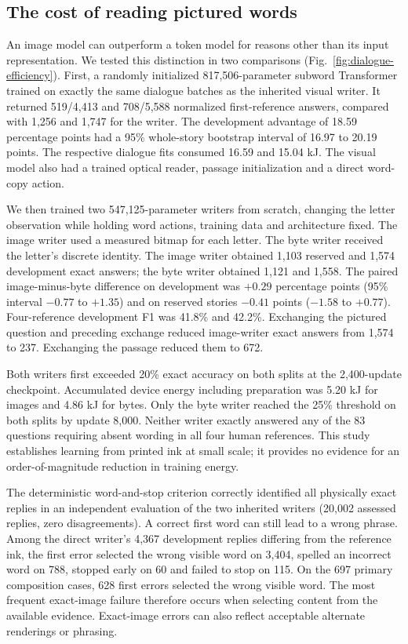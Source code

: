 \subsection*{The cost of reading pictured words}
An image model can outperform a token model for reasons other than its input representation. We tested this distinction in two comparisons (Fig.~\ref{fig:dialogue-efficiency}). First, a randomly initialized 817,506-parameter subword Transformer trained on exactly the same dialogue batches as the inherited visual writer. It returned 519/4,413 and 708/5,588 normalized first-reference answers, compared with 1,256 and 1,747 for the writer. The development advantage of 18.59 percentage points had a 95\% whole-story bootstrap interval of 16.97 to 20.19 points. The respective dialogue fits consumed 16.59 and 15.04 kJ. The visual model also had a trained optical reader, passage initialization and a direct word-copy action.

We then trained two 547,125-parameter writers from scratch, changing the letter observation while holding word actions, training data and architecture fixed. The image writer used a measured bitmap for each letter. The byte writer received the letter's discrete identity. The image writer obtained 1,103 reserved and 1,574 development exact answers; the byte writer obtained 1,121 and 1,558. The paired image-minus-byte difference on development was $+0.29$ percentage points (95\% interval $-0.77$ to $+1.35$) and on reserved stories $-0.41$ points ($-1.58$ to $+0.77$). Four-reference development F1 was 41.8\% and 42.2\%. Exchanging the pictured question and preceding exchange reduced image-writer exact answers from 1,574 to 237. Exchanging the passage reduced them to 672.

Both writers first exceeded 20\% exact accuracy on both splits at the 2,400-update checkpoint. Accumulated device energy including preparation was 5.20 kJ for images and 4.86 kJ for bytes. Only the byte writer reached the 25\% threshold on both splits by update 8,000. Neither writer exactly answered any of the 83 questions requiring absent wording in all four human references. This study establishes learning from printed ink at small scale; it provides no evidence for an order-of-magnitude reduction in training energy.

The deterministic word-and-stop criterion correctly identified all physically exact replies in an independent evaluation of the two inherited writers (20,002 assessed replies, zero disagreements). A correct first word can still lead to a wrong phrase. Among the direct writer's 4,367 development replies differing from the reference ink, the first error selected the wrong visible word on 3,404, spelled an incorrect word on 788, stopped early on 60 and failed to stop on 115. On the 697 primary composition cases, 628 first errors selected the wrong visible word. The most frequent exact-image failure therefore occurs when selecting content from the available evidence. Exact-image errors can also reflect acceptable alternate renderings or phrasing.
